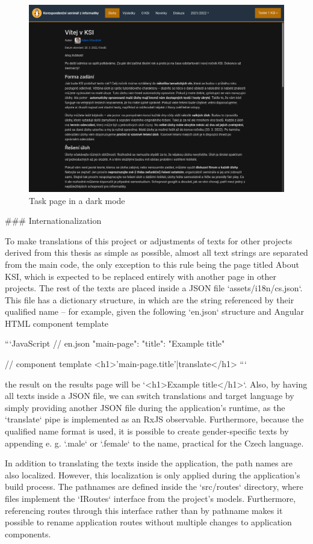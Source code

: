 \documentclass[
  digital, %
  oneside, %
  lof,     %
  nolot,     %
]{fithesis4}
\begin{document}
{\begin{figure}
\includegraphics[width=.8\textwidth]{assets/img/dark-mode}
\caption{Task page in a dark mode}
\label{fig:dark-mode}
\end{figure}

### Internationalization
\label{chap:translations}

To make translations of this project or adjustments of texts for other projects derived from this thesis as simple as possible, almost all text strings are separated from the main code, the only exception to this rule being the page titled About \acrshort{KSI}, which is expected to be replaced entirely with another page in other projects. The rest of the texts are placed inside a \acrshort{JSON} file `assets/i18n/cs.json`. This file has a dictionary structure, in which are the string referenced by their qualified name -- for example, given the following `en.json` structure and Angular HTML component template

```JavaScript
// en.json
{
	"main-page": {
		"title": "Example title"
	}
}

// component template
<h1>{{'main-page.title'|translate}}</h1>
```

the result on the results page will be `<h1>Example title</h1>`. Also, by having all texts inside a \acrshort{JSON} file, we can switch translations and target language by simply providing another \acrshort{JSON} file during the application's runtime, as the `translate` pipe is implemented as an RxJS observable. Furthermore, because the qualified name format is used, it is possible to create gender-specific texts by appending e. g. `.male` or `.female` to the name, practical for the Czech language.

In addition to translating the texts inside the application, the path names are also localized. However, this localization is only applied during the application's build process. The pathnames are defined inside the `src/routes` directory, where files implement the `IRoutes` interface from the project's models. Furthermore, referencing routes through this interface rather than by pathname makes it possible to rename application routes without multiple changes to application components.

}
\end{document}
